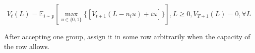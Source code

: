 $$V_{t}(L) = \mathbb{E}_{i \sim p} [\max_{u \in \{0,1\}} \{ {[V_{t+1}(L-n_i u)+ i u]}\}], L \geq 0, V_{T+1}(L) =0, \forall L$$

After accepting one group, assign it in some row arbitrarily when the capacity of the row allows.














